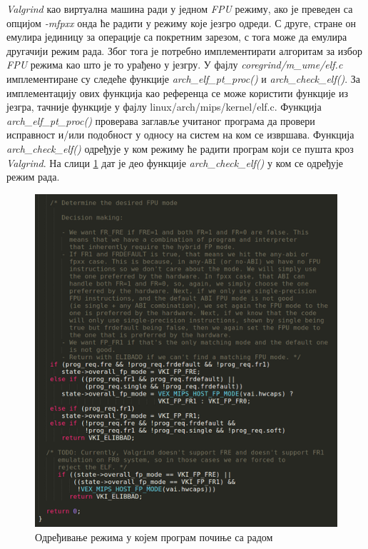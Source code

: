 \documentclass[12pt,oneside]{memoir}
\begin{document}
\indent \textit{Valgrind} као виртуална машина ради у једном \textit{FPU} режиму, ако је преведен са опцијом  \textit{-mfpxx} онда ће радити у режиму које језгро одреди. С друге, стране он емулира јединицу за операције са покретним зарезом, с тога може да емулира другачији режим рада. Због тога је потребно имплементирати алгоритам за избор \textit{FPU} режима као што је то урађено у језгру. У фајлу \textit{coregrind/m\_ume/elf.c} имплементиране су следеће функције \textit{arch\_elf\_pt\_proc()} и \textit{arch\_check\_elf()}. За имплементацију ових функција као референца се може користити  функције из језгра, тачније функције у фајлу 
linux/arch/mips/kernel/elf.c. Функција \textit{arch\_elf\_pt\_proc()} проверава заглавље учитаног програма да провери исправност и/или подобност у односу на систем на ком се извршава. Функција \textit{arch\_\-check\_elf()} одређује у ком режиму ће радити програм који се пушта кроз \textit{Valgrind}. На слици \ref{fig:fre} дат је део функције \textit{arch\_check\_elf()} у ком се одређује режим рада. 

\begin{figure}[h!]
\begin{center}
\includegraphics[scale=0.75]{slika29.png}
\end{center}
\caption{Одређивање режима у којем програм почиње са радом}
\label{fig:fre}
\end{figure}
\end{document}
